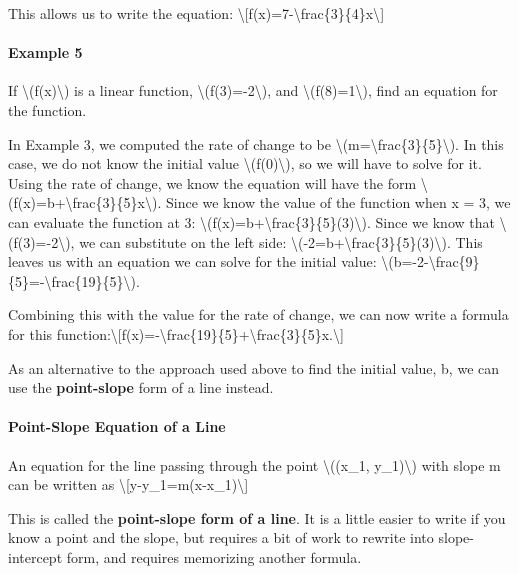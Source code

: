 This allows us to write the equation:
\textbackslash{}{[}f(x)=7-\textbackslash{}frac\{3\}\{4\}x\textbackslash{}{]}

\hypertarget{example-5}{%
\paragraph{Example 5}\label{example-5}}

If \textbackslash{}(f(x)\textbackslash{}) is a linear function,
\textbackslash{}(f(3)=-2\textbackslash{}), and
\textbackslash{}(f(8)=1\textbackslash{}), find an equation for the
function.

In Example 3, we computed the rate of change to be
\textbackslash{}(m=\textbackslash{}frac\{3\}\{5\}\textbackslash{}). In
this case, we do not know the initial value
\textbackslash{}(f(0)\textbackslash{}), so we will have to solve for it.
Using the rate of change, we know the equation will have the form
\textbackslash{}(f(x)=b+\textbackslash{}frac\{3\}\{5\}x\textbackslash{}).
Since we know the value of the function when x = 3, we can evaluate the
function at 3:
\textbackslash{}(f(x)=b+\textbackslash{}frac\{3\}\{5\}(3)\textbackslash{}).
Since we know that \textbackslash{}(f(3)=-2\textbackslash{}), we can
substitute on the left side:
\textbackslash{}(-2=b+\textbackslash{}frac\{3\}\{5\}(3)\textbackslash{}).
This leaves us with an equation we can solve for the initial value:
\textbackslash{}(b=-2-\textbackslash{}frac\{9\}\{5\}=-\textbackslash{}frac\{19\}\{5\}\textbackslash{}).

Combining this with the value for the rate of change, we can now write a
formula for this
function:\textbackslash{}{[}f(x)=-\textbackslash{}frac\{19\}\{5\}+\textbackslash{}frac\{3\}\{5\}x.\textbackslash{}{]}

As an alternative to the approach used above to find the initial value,
b, we can use the \textbf{point-slope} form of a line instead.

\hypertarget{point-slope-equation-of-a-line}{%
\paragraph{Point-Slope Equation of a
Line}\label{point-slope-equation-of-a-line}}

An equation for the line passing through the point
\textbackslash{}((x\_1, y\_1)\textbackslash{}) with slope m can be
written as \textbackslash{}{[}y-y\_1=m(x-x\_1)\textbackslash{}{]}

This is called the \textbf{point-slope form of a line}. It is a little
easier to write if you know a point and the slope, but requires a bit of
work to rewrite into slope-intercept form, and requires memorizing
another formula.

